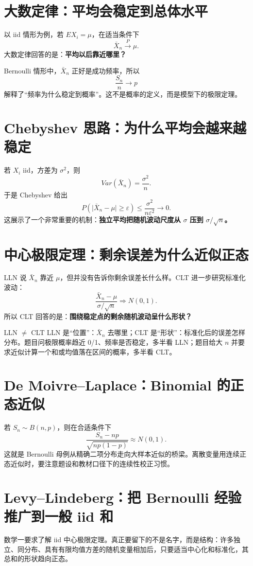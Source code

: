 \documentclass[11pt,a4paper,openany]{ctexbook}
\newcommand{\key}[1]{\textbf{\color{deep}#1}}
\begin{document}
\section{大数定律：平均会稳定到总体水平}
以 iid 情形为例，若 $EX_i=\mu$，在适当条件下
\[
\bar X_n\xrightarrow{P}\mu.
\]
大数定律回答的是：\key{平均以后靠近哪里？}

Bernoulli 情形中，$\bar X_n$ 正好是成功频率，所以
\[
\frac{S_n}{n}\to p
\]
解释了“频率为什么稳定到概率”。这不是概率的定义，而是模型下的极限定理。

\section{Chebyshev 思路：为什么平均会越来越稳定}
若 $X_i$ iid，方差为 $\sigma^2$，则
\[
Var(\bar X_n)=\frac{\sigma^2}{n}.
\]
于是 Chebyshev 给出
\[
P(\lvert\bar X_n-\mu\rvert\ge\varepsilon)\le\frac{\sigma^2}{n\varepsilon^2}\to0.
\]
这展示了一个非常重要的机制：\key{独立平均把随机波动尺度从 $\sigma$ 压到 $\sigma/\sqrt n$。}

\section{中心极限定理：剩余误差为什么近似正态}
LLN 说 $\bar X_n$ 靠近 $\mu$，但并没有告诉你剩余误差长什么样。CLT 进一步研究标准化波动：
\[
\frac{\bar X_n-\mu}{\sigma/\sqrt n}\Rightarrow N(0,1).
\]
所以 CLT 回答的是：\key{围绕稳定点的剩余随机波动呈什么形状？}

\begin{boundarybox}{LLN $\neq$ CLT}
LLN 是“位置”：$\bar X_n$ 去哪里；CLT 是“形状”：标准化后的误差怎样分布。题目问极限概率趋近 0/1、频率是否稳定，多半看 LLN；题目给大 $n$ 并要求近似计算一个和或均值落在区间的概率，多半看 CLT。
\end{boundarybox}

\section{De Moivre--Laplace：Binomial 的正态近似}
若 $S_n\sim B(n,p)$，则在合适条件下
\[
\frac{S_n-np}{\sqrt{np(1-p)}}\approx N(0,1).
\]
这就是 Bernoulli 母例从精确二项分布走向大样本近似的桥梁。离散变量用连续正态近似时，要注意题设和教材口径下的连续性校正习惯。

\section{Levy--Lindeberg：把 Bernoulli 经验推广到一般 iid 和}
数学一要求了解 iid 中心极限定理。真正要留下的不是名字，而是结构：许多独立、同分布、具有有限均值方差的随机变量相加后，只要适当中心化和标准化，其总和的形状趋向正态。
\end{document}

